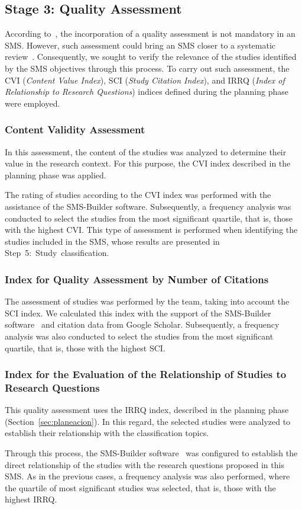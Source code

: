 %
\subsection{Stage 3: Quality Assessment}
According to~\cite{Ali-01}, the incorporation of a quality assessment is not mandatory in an SMS. However, such assessment could bring an SMS closer to a systematic review~\cite{Petersen-01}. Consequently, we sought to verify the relevance of the studies identified by the SMS objectives through this process. To carry out such assessment, the CVI (\textit{Content Value Index}), SCI (\textit{Study Citation Index}), and IRRQ (\textit{Index of Relationship to Research Questions}) indices defined during the planning phase were employed.

\subsubsection{Content Validity Assessment}
In this assessment, the content of the studies was analyzed to determine their value in the research context. For this purpose, the CVI index described in the planning phase was applied.

The rating of studies according to the CVI index was performed with the assistance of the SMS-Builder software. Subsequently, a frequency analysis was conducted to select the studies from the most significant quartile, that is, those with the highest CVI. This type of assessment is performed when identifying the \totalEtapaDos{} studies included in the SMS, whose results are presented in \hbox{Step 5: Study classification.}

\subsubsection{Index for Quality Assessment by Number of Citations}
The assessment of studies was performed by the team, taking into account the SCI index. We calculated this index with the support of the SMS-Builder software~\cite{sms-builder-repo} and citation data from Google Scholar. Subsequently, a frequency analysis was also conducted to select the studies from the most significant quartile, that is, those with the highest SCI.

\subsubsection{Index for the Evaluation of the Relationship of Studies to Research Questions}
This quality assessment uses the IRRQ index, described in the planning phase (Section~\ref{sec:planeacion}). In this regard, the selected studies were analyzed to establish their relationship with the classification topics.

Through this process, the SMS-Builder software~\cite{sms-builder-repo} was configured to establish the direct relationship of the studies with the research questions proposed in this SMS. As in the previous cases, a frequency analysis was also performed, where the quartile of most significant studies was selected, that is, those with the highest IRRQ.